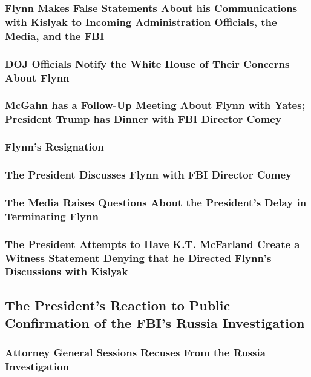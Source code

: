 \subsubsection{Flynn Makes False Statements About his Communications with Kislyak to Incoming Administration Officials, the Media, and the FBI}

\subsubsection{DOJ Officials Notify the White House of Their Concerns About Flynn}

\subsubsection{McGahn has a Follow-Up Meeting About Flynn with Yates; President Trump has Dinner with FBI Director Comey}

\subsubsection{Flynn's Resignation}

\subsubsection{The President Discusses Flynn with FBI Director Comey}

\subsubsection{The Media Raises Questions About the President's Delay in Terminating Flynn}

\subsubsection{The President Attempts to Have K.T. McFarland Create a Witness Statement Denying that he Directed Flynn's Discussions with Kislyak}

\subsection{The President's Reaction to Public Confirmation of the FBI's Russia Investigation}

\subsubsection{Attorney General Sessions Recuses From the Russia Investigation}

